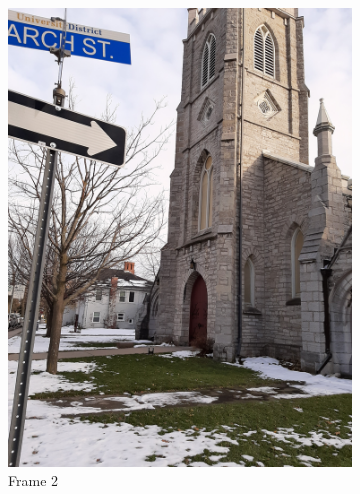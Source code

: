 \documentclass[conference]{IEEEtran}
\begin{document}
\begin{figure}[!h]
\begin{subfigure}[b]{0.2\linewidth}
    \includegraphics[width=\linewidth, angle = -90]{images/frame2.jpg}
    \caption{Frame 2}
  \end{subfigure}
  \begin{subfigure}[b]{0.2\linewidth}

\end{subfigure}
\end{figure}
\end{document}
